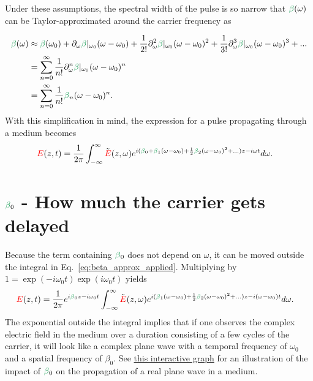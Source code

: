 Under these assumptions, the spectral width of the pulse is so narrow that $\betag(\omega)$ can be Taylor-approximated around the carrier frequency as

\begin{align}
\label{eq:beta_approx}
    \betag(\omega)&\approx \betag(\omega_0)+\partial_\omega\betag|_{\omega_0}(\omega-\omega_0)+\frac{1}{2!}\partial^2_\omega\betag|_{\omega_0}(\omega-\omega_0)^2+
    \frac{1}{3!}\partial^3_\omega\betag|_{\omega_0}(\omega-\omega_0)^3+... \\ \nonumber
    &= \sum_{n=0}^{\infty} \frac{1}{n!}\partial^n_\omega\betag|_{\omega_0}(\omega-\omega_0)^n\\ \nonumber
    &=\sum_{n=0}^{\infty} \frac{1}{n!}\betag_n(\omega-\omega_0)^n.
\end{align}
With this simplification in mind, the expression for a pulse propagating through a medium becomes
\begin{align}
\label{eq:beta_approx_applied}
    \E(z,t) &= \frac{1}{2\pi}\int_{-\infty}^{\infty} \Tilde{\E}(z,\omega) e^{i(\betag_0+\betag_1(\omega-\omega_0)+\frac{1}{2}\betag_2(\omega-\omega_0)^2+...)z-i\omega t} d\omega.
\end{align}


\section{$\betag_0$ - How much the carrier gets delayed}
Because the term containing $\betag_0$ does not depend on $\omega$, it can be moved outside the integral in Eq.~\ref{eq:beta_approx_applied}. Multiplying by $1=\exp(-i\omega_0t)\exp(i\omega_0t)$ yields
\begin{align}
\label{eq:beta_approx_applied}
    \E(z,t) &= \frac{1}{2\pi} e^{i\betag_0z-i\omega_0t}  \int_{-\infty}^{\infty} \Tilde{\E}(z,\omega) e^{i(\betag_1(\omega-\omega_0)+\frac{1}{2}\betag_2(\omega-\omega_0)^2+...)z-i(\omega-\omega_0) t} d\omega.
\end{align}
The exponential outside the integral implies that if one observes the complex electric field in the medium over a duration consisting of a few cycles of the carrier, it will look like a complex plane wave with a temporal frequency of $\omega_0$ and a spatial frequency of $\beta_0$. See \href{https://www.desmos.com/calculator/ausd1wnl2j}{this interactive graph} for an illustration of the impact of $\betag_0$ on the propagation of a real plane wave in a medium. 

